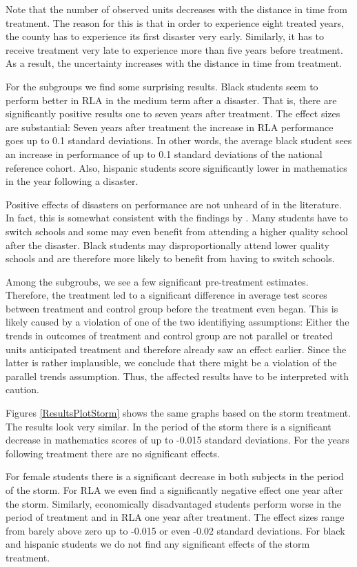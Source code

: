 Note that the number of observed units decreases with the distance in time from treatment. The reason for this is that in order to experience eight treated years, the county has to experience its first disaster very early. Similarly, it has to receive treatment very late to experience more than five years before treatment. As a result, the uncertainty increases with the distance in time from treatment.

For the subgroups we find some surprising results. Black students seem to perform better in RLA in the medium term after a disaster. That is, there are significantly positive results one to seven years after treatment. The effect sizes are substantial: Seven years after treatment the increase in RLA performance goes up to 0.1 standard deviations. In other words, the average black student sees an increase in performance of up to 0.1 standard deviations of the national reference cohort. Also, hispanic students score significantly lower in mathematics in the year following a disaster.

Positive effects of disasters on performance are not unheard of in the literature. In fact, this is somewhat consistent with the findings by \cite{Sacerdote_2012}. Many students have to switch schools and some may even benefit from attending a higher quality school after the disaster. Black students may disproportionally attend lower quality schools and are therefore more likely to benefit from having to switch schools. 

Among the subgroubs, we see a few significant pre-treatment estimates. Therefore, the treatment led to a significant difference in average test scores between treatment and control group before the treatment even began. This is likely caused by a violation of one of the two identifiying assumptions: Either the trends in outcomes of treatment and control group are not parallel or treated units anticipated treatment and therefore already saw an effect earlier. Since the latter is rather implausible, we conclude that there might be a violation of the parallel trends assumption. Thus, the affected results have to be interpreted with caution.

Figures \ref{ResultsPlotStorm} shows the same graphs based on the storm treatment. The results look very similar. In the period of the storm there is a significant decrease in mathematics scores of up to -0.015 standard deviations. For the years following treatment there are no significant effects.

For female students there is a significant decrease in both subjects in the period of the storm. For RLA we even find a significantly negative effect one year after the storm. Similarly, economically disadvantaged students perform worse in the period of treatment and in RLA one year after treatment. The effect sizes range from barely above zero up to -0.015 or even -0.02 standard deviations. For black and hispanic students we do not find any significant effects of the storm treatment.

